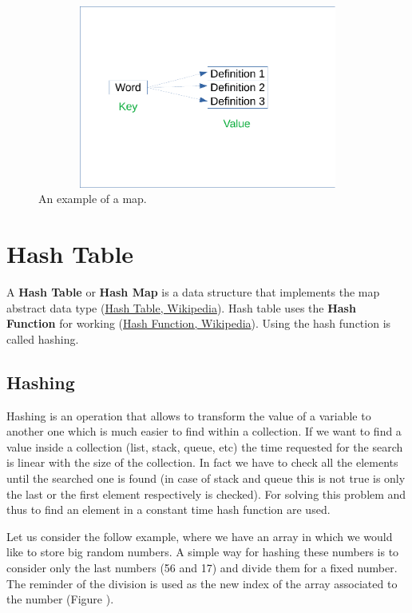 \begin{figure}[h]
	\includegraphics[width=14cm,height=6cm]{chapters/datastructures/images/map_1.pdf}
	\caption[]{An example of a map.}
	\label{map_1}
\end{figure}

\section{Hash Table}
A \textbf{Hash Table} or \textbf{Hash Map} is a data structure that implements the map abstract data type \cite{wikihashtable} (\href{https://en.wikipedia.org/wiki/Hash_table}{Hash Table, Wikipedia}). Hash table uses the \textbf{Hash Function} for working \cite{wikihashfunction} (\href{https://en.wikipedia.org/wiki/Hash_function}{Hash Function, Wikipedia}). Using the hash function is called hashing.

\subsection{Hashing}
Hashing is an operation that allows to transform the value of a variable to another one which is much easier to find within a collection. If we want to find a value inside a collection (list, stack, queue, etc) the time requested for the search is linear with the size of the collection. In fact we have to check all the elements until the searched one is found (in case of stack and queue this is not true is only the last or the first element respectively is checked). For solving this problem and thus to find an element in a constant time hash function are used. 

Let us consider the follow example, where we have an array in which we would like to store big random numbers. A simple way for hashing these numbers is to consider only the last numbers (56 and 17) and divide them for a fixed number. The reminder of the division is used as the new index of the array associated to the number (Figure ).


